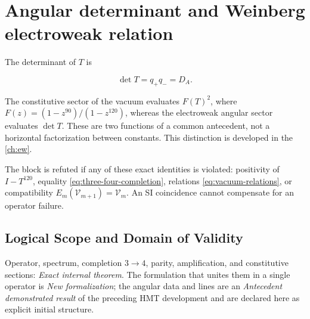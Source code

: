 \section{Angular determinant and Weinberg electroweak relation}

The determinant of \(T\) is

\begin{equation}
\det T=q_+q_-=D_A.
\label{eq:detT}
\end{equation}

The constitutive sector of the vacuum evaluates \(F(T)^2\), where
\(F(z)=(1-z^{90})/(1-z^{120})\), whereas the electroweak angular
sector evaluates \(\det T\). These are two functions of a
common antecedent, not a horizontal factorization between constants.
This distinction is developed in the \cref{ch:ew}.

\begin{remark}
The block is refuted if any of these exact identities is violated:
positivity of \(I-T^{120}\), equality
\cref{eq:three-four-completion}, relations \cref{eq:vacuum-relations}, or
compatibility \(E_m(\mathcal V_{m+1})=\mathcal V_m\). An SI coincidence
cannot compensate for an operator failure.
\end{remark}

\subsection*{Logical Scope and Domain of Validity}
Operator, spectrum, completion \(3\to4\), parity, amplification, and constitutive sections: \emph{Exact internal theorem}. The formulation that unites them in a single operator is \emph{New formalization}; the angular data and lines are an \emph{Antecedent demonstrated result} of the preceding HMT development and are declared here as explicit initial structure.

